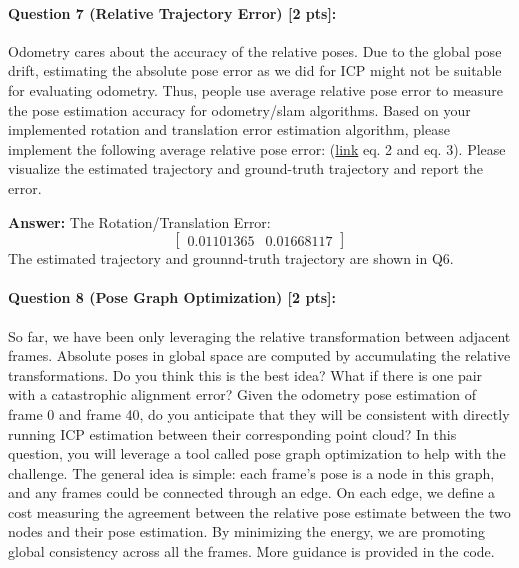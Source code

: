 \documentclass[11pt]{article}
\begin{document}
\paragraph{Question 7 (Relative Trajectory Error) [2 pts]:}
Odometry cares about the accuracy of the relative poses. Due to the global pose drift, estimating the absolute pose error as we did for ICP might not be suitable for evaluating odometry. Thus, people use average relative pose error to measure the pose estimation accuracy for odometry/slam algorithms. Based on your implemented rotation and translation error estimation algorithm, please implement the following average relative pose error: (\href{http://www.cvlibs.net/publications/Geiger2012CVPR.pdf}{link} eq. 2 and eq. 3). Please visualize the estimated trajectory and ground-truth trajectory and report the error. 

\textbf{Answer: }The Rotation/Translation Error: 
$$\begin{bmatrix} 0.01101365 & 0.01668117 \end{bmatrix}$$
The estimated trajectory and grounnd-truth trajectory are shown in Q6.

\paragraph{Question 8 (Pose Graph Optimization) [2 pts]:}
So far, we have been only leveraging the relative transformation between adjacent frames. Absolute poses in global space are computed by accumulating the relative transformations. Do you think this is the best idea? What if there is one pair with a catastrophic alignment error? Given the odometry pose estimation of frame 0 and frame 40,
do you anticipate that they will be consistent with directly running ICP estimation between their corresponding point cloud? In this question, you will leverage a tool called pose graph optimization to help with the challenge. The general idea is simple: each frame's pose is a node in this graph, and any frames could be connected through an edge. On each edge, we define a cost measuring the agreement between the relative pose estimate between the two nodes and their pose estimation. By minimizing the energy, we are promoting global consistency across all the frames. More guidance is provided in the code.
\end{document}
